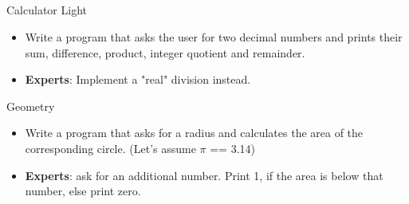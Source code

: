 \subsection{}
\begin{frame}{Calculator Light}
	\begin{itemize}
		\item Write a program that asks the user for two decimal numbers and prints their sum, difference, product, integer quotient and remainder.
		\item \textbf{Experts}: Implement a "real" division instead.
	\end{itemize}
\end{frame}
\begin{frame}{Geometry}
	\begin{itemize}
		\item Write a program that asks for a radius and calculates the area of the corresponding circle. (Let's assume $\pi$ == 3.14)
		\item \textbf{Experts}: ask for an additional number. Print 1, if the area is below that number, else print zero.
	\end{itemize}
\end{frame}

